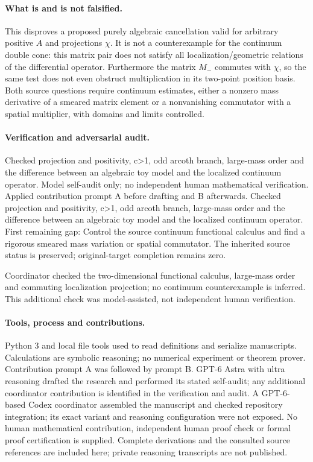 \documentclass[11pt]{article}
\begin{document}
\paragraph{What is and is not falsified.} This disproves a proposed purely algebraic cancellation valid for arbitrary positive \(A\) and projections \(\chi\). It is not a counterexample for the continuum double cone: this matrix pair does not satisfy all localization/geometric relations of the differential operator. Furthermore the matrix \(M_-\) commutes with \(\chi\), so the same test does not even obstruct multiplication in its two-point position basis. Both source questions require continuum estimates, either a nonzero mass derivative of a smeared matrix element or a nonvanishing commutator with a spatial multiplier, with domains and limits controlled.

\paragraph{Verification and adversarial audit.}
Checked projection and positivity, c>1, odd arcoth branch, large-mass order and the difference between an algebraic toy model and the localized continuum operator. Model self-audit only; no independent human mathematical verification. Applied contribution prompt A before drafting and B afterwards. Checked projection and positivity, c>1, odd arcoth branch, large-mass order and the difference between an algebraic toy model and the localized continuum operator. First remaining gap: Control the source continuum functional calculus and find a rigorous smeared mass variation or spatial commutator. The inherited source status is preserved; original-target completion remains zero.

Coordinator checked the two-dimensional functional calculus, large-mass order and commuting localization projection; no continuum counterexample is inferred. This additional check was model-assisted, not independent human verification.

\paragraph{Tools, process and contributions.}
Python 3 and local file tools used to read definitions and serialize manuscripts. Calculations are symbolic reasoning; no numerical experiment or theorem prover. Contribution prompt A was followed by prompt B. GPT-6 Astra with ultra reasoning drafted the research and performed its stated self-audit; any additional coordinator contribution is identified in the verification and audit. A GPT-6-based Codex coordinator assembled the manuscript and checked repository integration; its exact variant and reasoning configuration were not exposed. No human mathematical contribution, independent human proof check or formal proof certification is supplied. Complete derivations and the consulted source references are included here; private reasoning transcripts are not published.
\end{document}
